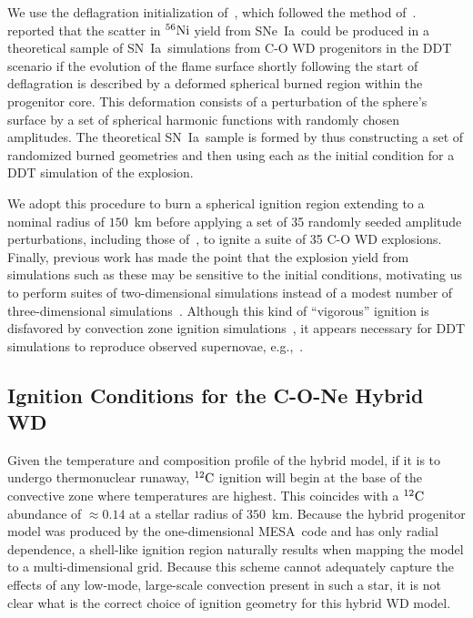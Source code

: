 \documentclass[iop,apj]{emulateapj}
\newcommand{\SNeIa}{SNe~Ia}
\newcommand{\SNIa}{SN~Ia}
\newcommand{\C}[1]{\ensuremath{{}^{#1}{\rm C}}}
\newcommand{\Ni}[1]{\ensuremath{{}^{#1}{\rm Ni}}}
\newcommand{\code}[1]{\textsc{#1}}
\newcommand{\MESA}{\code{MESA}}
\begin{document}
We use the deflagration initialization of~\citet{kruegetal12}, which
followed the method of~\citet{townetal2009}. \citet{townetal2009}
reported that the scatter in \Ni{56} yield from \SNeIa\ could be
produced in a theoretical sample of \SNIa\ simulations from C-O WD
progenitors in the DDT scenario if the evolution of the flame surface
shortly following the start of deflagration is described by a deformed
spherical burned region within the progenitor core. This deformation
consists of a perturbation of the sphere's surface by a set of
spherical harmonic functions with randomly chosen amplitudes. The
theoretical \SNIa\ sample is formed by thus constructing a set of
randomized burned geometries and then using each as the initial
condition for a DDT simulation of the explosion.

We adopt this procedure to burn a spherical ignition region extending
to a nominal radius of $150$~km before applying a set of 35 randomly
seeded amplitude perturbations, including those
of~\citet{kruegetal12}, to ignite a suite of 35 C-O WD
explosions. Finally, previous work has made the point that the
explosion yield from simulations such as these may be sensitive to the
initial conditions, motivating us to perform suites of two-dimensional
simulations instead of a modest number of three-dimensional
simulations~\citep{scidac}. Although this kind of ``vigorous''
ignition is disfavored by convection zone ignition
simulations~\citep{nonakaetal2012}, it appears necessary for DDT
simulations to reproduce observed supernovae,
e.g.,~\citep{seitenzahletal13, Simetal2013}.

\subsection{Ignition Conditions for the C-O-Ne Hybrid WD}
\label{subsec:hybrid_ignition_parameters}
Given the temperature and composition profile of the hybrid model, if
it is to undergo thermonuclear runaway, \C{12} ignition will begin at
the base of the convective zone where temperatures are highest. This
coincides with a \C{12} abundance of $\approx 0.14$ at a stellar
radius of $350$~km. Because the hybrid progenitor model was produced
by the one-dimensional \MESA\ code and has only radial dependence, a
shell-like ignition region naturally results when mapping the model to
a multi-dimensional grid. Because this scheme cannot adequately
capture the effects of any low-mode, large-scale convection present in
such a star, it is not clear what is the correct choice of ignition
geometry for this hybrid WD model.
\end{document}
